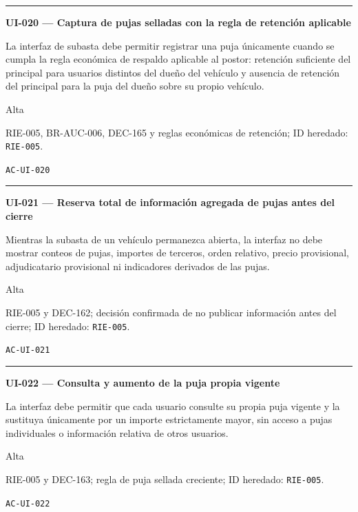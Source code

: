 \documentclass[10pt,letterpaper]{article}
\begin{document}
\vspace{0.25em}\hrule\vspace{0.65em}
\noindent\textbf{UI-020 --- Captura de pujas selladas con la regla de retención aplicable}\par
\begin{description}[style=nextline,leftmargin=3.15cm,labelwidth=2.8cm,font=\normalfont\bfseries]
\item[Obligación] La interfaz de subasta debe permitir registrar una puja únicamente cuando se cumpla la regla económica de respaldo aplicable al postor: retención suficiente del principal para usuarios distintos del dueño del vehículo y ausencia de retención del principal para la puja del dueño sobre su propio vehículo.
\item[Prioridad] Alta
\item[Procedencia] RIE-005, BR-AUC-006, DEC-165 y reglas económicas de retención; ID heredado: \texttt{RIE-005}.
\item[Verificación] \texttt{AC-UI-020}
\end{description}
\vspace{0.25em}\hrule\vspace{0.65em}
\noindent\textbf{UI-021 --- Reserva total de información agregada de pujas antes del cierre}\par
\begin{description}[style=nextline,leftmargin=3.15cm,labelwidth=2.8cm,font=\normalfont\bfseries]
\item[Obligación] Mientras la subasta de un vehículo permanezca abierta, la interfaz no debe mostrar conteos de pujas, importes de terceros, orden relativo, precio provisional, adjudicatario provisional ni indicadores derivados de las pujas.
\item[Prioridad] Alta
\item[Procedencia] RIE-005 y DEC-162; decisión confirmada de no publicar información antes del cierre; ID heredado: \texttt{RIE-005}.
\item[Verificación] \texttt{AC-UI-021}
\end{description}
\vspace{0.25em}\hrule\vspace{0.65em}
\noindent\textbf{UI-022 --- Consulta y aumento de la puja propia vigente}\par
\begin{description}[style=nextline,leftmargin=3.15cm,labelwidth=2.8cm,font=\normalfont\bfseries]
\item[Obligación] La interfaz debe permitir que cada usuario consulte su propia puja vigente y la sustituya únicamente por un importe estrictamente mayor, sin acceso a pujas individuales o información relativa de otros usuarios.
\item[Prioridad] Alta
\item[Procedencia] RIE-005 y DEC-163; regla de puja sellada creciente; ID heredado: \texttt{RIE-005}.
\item[Verificación] \texttt{AC-UI-022}
\end{description}
\end{document}
